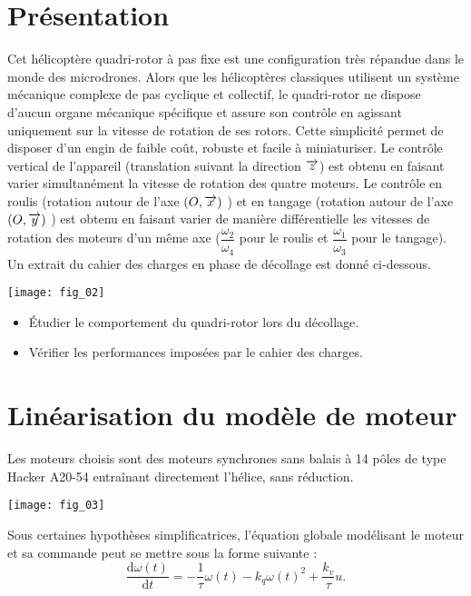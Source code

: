 \begin{multicols}{2}
\setcounter{exo}{0}
\section*{Présentation}
Cet hélicoptère quadri-rotor à pas fixe est une configuration très répandue dans le monde des microdrones.
Alors que les hélicoptères classiques utilisent un système mécanique complexe de pas cyclique et
collectif, le quadri-rotor ne dispose d'aucun organe mécanique spécifique et assure son contrôle en agissant
uniquement sur la vitesse de rotation de ses rotors. Cette simplicité permet de disposer d'un engin de faible
coût, robuste et facile à miniaturiser.
Le contrôle vertical de l'appareil (translation suivant la direction $\overrightarrow{z}$) est obtenu en faisant varier
simultanément la vitesse de rotation des quatre moteurs. Le contrôle en roulis (rotation autour de l’axe $(O,\overrightarrow{x})$ ) et en tangage (rotation autour de l’axe $(O,\overrightarrow{y})$ ) est obtenu en faisant varier de manière différentielle
les vitesses de rotation des moteurs d'un même axe ($\dfrac{\omega_2}{\omega_4}$  pour le roulis et $\dfrac{\omega_1}{\omega_3}$ pour le tangage).
Un extrait du cahier des charges en phase de décollage est donné ci-dessous.


\begin{center}
\texttt{[image: fig\_02]}
\end{center}

\begin{obj}
\begin{itemize}
\item Étudier le comportement du quadri-rotor lors du décollage.
\item Vérifier les performances imposées par le cahier des charges.
\end{itemize}
\end{obj}

\section*{Linéarisation du modèle de moteur}
Les moteurs choisis sont des moteurs synchrones sans balais à 14 pôles de type Hacker A20-54 entraînant
directement l'hélice, sans réduction.

\begin{center}
\texttt{[image: fig\_03]}
\end{center}

Sous certaines hypothèses simplificatrices, l'équation globale modélisant le moteur et sa commande peut se
mettre sous la forme suivante :
$$
\dfrac{\text{d}\omega(t)}{\text{d}t}=-\dfrac{1}{\tau}\omega(t) -k_q\omega(t)^2 + \dfrac{k_v}{\tau}u.
$$


\end{multicols}

